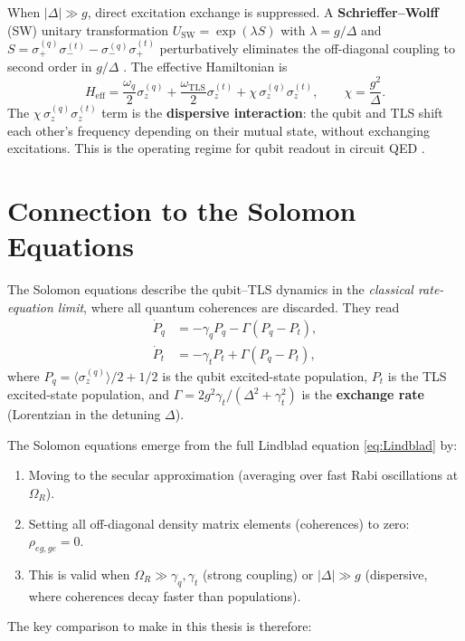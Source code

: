 \documentclass[12pt,a4paper]{article}
\newcommand{\wq}{\omega_q}
\newcommand{\wt}{\omega_{\mathrm{TLS}}}
\newcommand{\D}{\Delta}
\newcommand{\smq}{\sigma_-^{(q)}}
\newcommand{\spq}{\sigma_+^{(q)}}
\newcommand{\smt}{\sigma_-^{(t)}}
\newcommand{\spt}{\sigma_+^{(t)}}
\newcommand{\szq}{\sigma_z^{(q)}}
\newcommand{\szt}{\sigma_z^{(t)}}
\begin{document}
When $|\D| \gg g$, direct excitation exchange is suppressed.
A \textbf{Schrieffer--Wolff} (SW) unitary transformation
$U_{\mathrm{SW}} = \exp(\lambda S)$ with
$\lambda = g/\D$ and $S = \spq\smt - \smq\spt$
perturbatively eliminates the off-diagonal coupling to second order in
$g/\D$ \cite{Blais2021,Bravyi2011}. The effective Hamiltonian is
\begin{equation}
  H_{\mathrm{eff}}
  = \frac{\wq}{2}\szq + \frac{\wt}{2}\szt
  + \chi\,\szq\szt,
  \qquad
  \chi = \frac{g^2}{\D}.
  \label{eq:H_disp}
\end{equation}
The $\chi\,\szq\szt$ term is the \textbf{dispersive interaction}: the
qubit and TLS shift each other's frequency depending on their mutual
state, without exchanging excitations. This is the operating regime for
qubit readout in circuit QED \cite{Blais2021}.

\section{Connection to the Solomon Equations}

The Solomon equations \cite{Solomon1955,Ashhab2006} describe the
qubit--TLS dynamics in the \emph{classical rate-equation limit}, where
all quantum coherences are discarded. They read
\begin{align}
  \dot P_q &= -\gamma_q P_q
             - \Gamma(P_q - P_t), \label{eq:Solomon_q}\\
  \dot P_t &= -\gamma_t P_t
             + \Gamma(P_q - P_t), \label{eq:Solomon_t}
\end{align}
where $P_q = \langle\szq\rangle/2 + 1/2$ is the qubit excited-state
population, $P_t$ is the TLS excited-state population, and
$\Gamma = 2g^2\gamma_t/(\D^2 + \gamma_t^2)$ is the
\textbf{exchange rate} (Lorentzian in the detuning $\D$).

The Solomon equations emerge from the full Lindblad equation
\eqref{eq:Lindblad} by:
\begin{enumerate}
  \item Moving to the secular approximation (averaging over fast Rabi
        oscillations at $\Omega_R$).
  \item Setting all off-diagonal density matrix elements (coherences) to
        zero: $\rho_{eg,ge} = 0$.
  \item This is valid when $\Omega_R \gg \gamma_q, \gamma_t$
        (strong coupling) or $|\D| \gg g$ (dispersive, where coherences
        decay faster than populations).
\end{enumerate}
The key comparison to make in this thesis is therefore:
\end{document}
